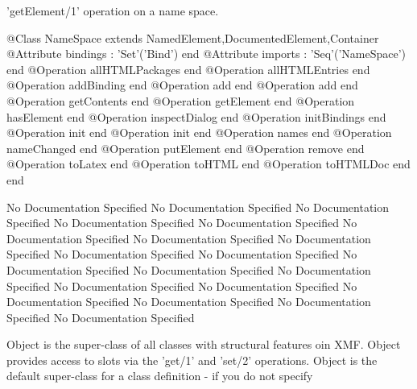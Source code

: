       'getElement/1' operation on a name space.
\begin{Interface}
@Class NameSpace extends NamedElement,DocumentedElement,Container
  @Attribute bindings : 'Set'('Bind') end
  @Attribute imports : 'Seq'('NameSpace') end
  @Operation allHTMLPackages end
  @Operation allHTMLEntries end
  @Operation addBinding end
  @Operation add end
  @Operation add end
  @Operation getContents end
  @Operation getElement end
  @Operation hasElement end
  @Operation inspectDialog end
  @Operation initBindings end
  @Operation init end
  @Operation init end
  @Operation names end
  @Operation nameChanged end
  @Operation putElement end
  @Operation remove end
  @Operation toLatex end
  @Operation toHTML end
  @Operation toHTMLDoc end
end
\end{Interface}
No Documentation Specified
No Documentation Specified
No Documentation Specified
No Documentation Specified
No Documentation Specified
No Documentation Specified
No Documentation Specified
No Documentation Specified
No Documentation Specified
No Documentation Specified
No Documentation Specified
No Documentation Specified
No Documentation Specified
No Documentation Specified
No Documentation Specified
No Documentation Specified
No Documentation Specified
No Documentation Specified
No Documentation Specified

      Object is the super-class of all classes with structural features oin XMF.
      Object provides access to slots via the 'get/1' and 'set/2' operations.
      Object is the default super-class for a class definition - if you do not specify


